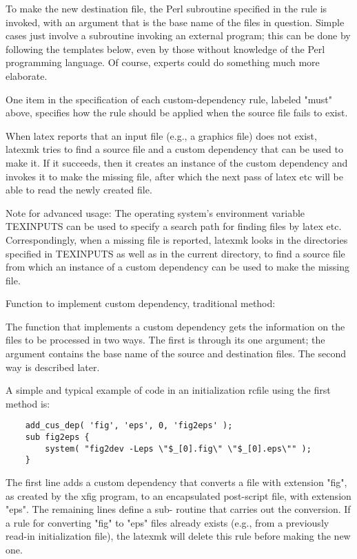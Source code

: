 To make the new destination file, the Perl subroutine specified in  the
rule is invoked, with an argument that is the base name of the files in
question.  Simple cases just involve a subroutine invoking an  external
program;  this  can  be  done by following the templates below, even by
those without knowledge of the Perl programming language.   Of  course,
experts could do something much more elaborate.

One  item  in the specification of each custom-dependency rule, labeled
"must" above, specifies how the rule should be applied when the  source
file fails to exist.

When  latex reports that an input file (e.g., a graphics file) does not
exist, latexmk tries to find a source file and a custom dependency that
can be used to make it.  If it succeeds, then it creates an instance of
the custom dependency and invokes it to make the  missing  file,  after
which the next pass of latex etc will be able to read the newly created
file.

Note for advanced usage: The operating  system's  environment  variable
TEXINPUTS can be used to specify a search path for finding files by latex
etc.  Correspondingly, when a missing  file  is  reported,  latexmk looks  in
the directories specified in TEXINPUTS as well as in the current directory,
to find a source file from which an instance of a  custom dependency can be
used to make the missing file.

Function to implement custom dependency, traditional method:

The  function  that implements a custom dependency gets the information on the
files to be processed in two ways.  The first is through its one argument;  the
argument contains the base name of the source and destination files.  The
second way is described later.

A simple and typical example of code in an initialization rcfile  using
the first method is:

\begin{verbatim}
	add_cus_dep( 'fig', 'eps', 0, 'fig2eps' );
	sub fig2eps {
		system( "fig2dev -Leps \"$_[0].fig\" \"$_[0].eps\"" );
	}
\end{verbatim}

The  first  line adds a custom dependency that converts a file with extension
"fig", as created by the xfig program, to an encapsulated post-script  file,
with extension "eps".  The remaining lines define a sub- routine that carries
out the conversion.   If  a  rule  for  converting "fig"  to  "eps"  files
already exists (e.g., from a previously read-in initialization file), the
latexmk will delete this rule  before  making the new one.

